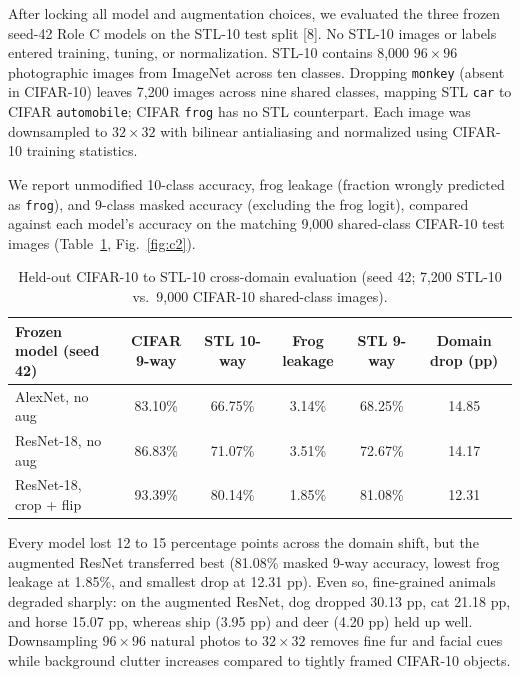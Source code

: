 \documentclass[10pt,a4paper]{article}
\begin{document}
After locking all model and augmentation choices, we evaluated the three frozen seed-42 Role C models on the STL-10 test split [8]. No STL-10 images or labels entered training, tuning, or normalization. STL-10 contains 8,000 $96\times 96$ photographic images from ImageNet across ten classes. Dropping \texttt{monkey} (absent in CIFAR-10) leaves 7,200 images across nine shared classes, mapping STL \texttt{car} to CIFAR \texttt{automobile}; CIFAR \texttt{frog} has no STL counterpart. Each image was downsampled to $32\times 32$ with bilinear antialiasing and normalized using CIFAR-10 training statistics.

We report unmodified 10-class accuracy, frog leakage (fraction wrongly predicted as \texttt{frog}), and 9-class masked accuracy (excluding the frog logit), compared against each model's accuracy on the matching 9,000 shared-class CIFAR-10 test images (Table~\ref{tab:c2}, Fig.~\ref{fig:c2}).

\begin{table}[H]
\centering
\caption{Held-out CIFAR-10 to STL-10 cross-domain evaluation (seed 42; 7,200 STL-10 vs.\ 9,000 CIFAR-10 shared-class images).}
\label{tab:c2}
\footnotesize
\begin{tabular}{@{}lccccc@{}}
\toprule
\textbf{Frozen model (seed 42)} & \textbf{CIFAR 9-way} & \textbf{STL 10-way} & \textbf{Frog leakage} & \textbf{STL 9-way} & \textbf{Domain drop (pp)} \\
\midrule
AlexNet, no aug & 83.10\% & 66.75\% & 3.14\% & 68.25\% & 14.85 \\
ResNet-18, no aug & 86.83\% & 71.07\% & 3.51\% & 72.67\% & 14.17 \\
ResNet-18, crop + flip & 93.39\% & 80.14\% & 1.85\% & 81.08\% & 12.31 \\
\bottomrule
\end{tabular}
\end{table}

Every model lost 12 to 15 percentage points across the domain shift, but the augmented ResNet transferred best (81.08\% masked 9-way accuracy, lowest frog leakage at 1.85\%, and smallest drop at 12.31 pp). Even so, fine-grained animals degraded sharply: on the augmented ResNet, dog dropped 30.13 pp, cat 21.18 pp, and horse 15.07 pp, whereas ship (3.95 pp) and deer (4.20 pp) held up well. Downsampling $96\times 96$ natural photos to $32\times 32$ removes fine fur and facial cues while background clutter increases compared to tightly framed CIFAR-10 objects.
\end{document}
